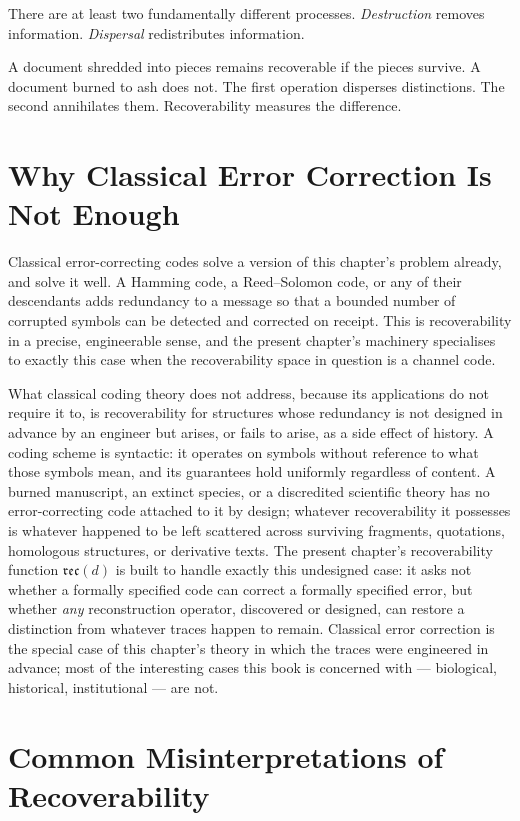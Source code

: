 \documentclass[12pt,twoside,openright]{book}
\newcommand{\reco}{\mathfrak{rec}}
\begin{document}
There are at least two fundamentally different processes.
\emph{Destruction} removes information.
\emph{Dispersal} redistributes information.

A document shredded into pieces remains recoverable if
the pieces survive. A document burned to ash does not.
The first operation disperses distinctions. The second
annihilates them. Recoverability measures the difference.

\section{Why Classical Error Correction Is Not Enough}
\label{sec:ch5-why-classical-insufficient}

Classical error-correcting codes solve a version of this
chapter's problem already, and solve it well. A Hamming
code, a Reed--Solomon code, or any of their descendants
\parencite{shannon1948,cover2006} adds redundancy to a
message so that a bounded number of corrupted symbols can
be detected and corrected on receipt. This is recoverability
in a precise, engineerable sense, and the present chapter's
machinery specialises to exactly this case when the
recoverability space in question is a channel code.

What classical coding theory does not address, because its
applications do not require it to, is recoverability for
structures whose redundancy is not designed in advance by an
engineer but arises, or fails to arise, as a side effect of
history. A coding scheme is syntactic: it operates on symbols
without reference to what those symbols mean, and its
guarantees hold uniformly regardless of content. A burned
manuscript, an extinct species, or a discredited scientific
theory has no error-correcting code attached to it by design;
whatever recoverability it possesses is whatever happened to
be left scattered across surviving fragments, quotations,
homologous structures, or derivative texts. The present
chapter's recoverability function $\reco(d)$ is built to
handle exactly this undesigned case: it asks not whether a
formally specified code can correct a formally specified
error, but whether \emph{any} reconstruction operator,
discovered or designed, can restore a distinction from
whatever traces happen to remain. Classical error correction
is the special case of this chapter's theory in which the
traces were engineered in advance; most of the interesting
cases this book is concerned with --- biological, historical,
institutional --- are not.

\section{Common Misinterpretations of Recoverability}
\label{sec:ch5-misinterpretations}
\end{document}
